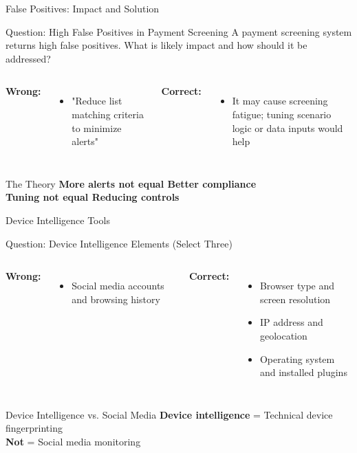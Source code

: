 \documentclass{beamer}
\begin{document}
\begin{frame}{False Positives: Impact and Solution}
\begin{block}{Question: High False Positives in Payment Screening}
\small{A payment screening system returns high false positives. What is likely impact and how should it be addressed?}
\end{block}

\begin{columns}
\textcolor{wrong}{\textbf{ Wrong:}}
\begin{itemize}
    \item "Reduce list matching criteria to minimize alerts"
\end{itemize}

\textcolor{correct}{\textbf{Correct:}}
\begin{itemize}
    \item It may cause screening fatigue; tuning scenario logic or data inputs would help
\end{itemize}
\end{columns}

\begin{block}{The Theory}
\textbf{More alerts not equal Better compliance} \\
\textbf{Tuning not equal Reducing controls}
\end{block}
\end{frame}

\begin{frame}{Device Intelligence Tools}
\begin{block}{Question: Device Intelligence Elements (Select Three)}
\end{block}

\begin{columns}
\textcolor{wrong}{\textbf{ Wrong:}}
\begin{itemize}
    \item Social media accounts and browsing history
\end{itemize}

\textcolor{correct}{\textbf{Correct:}}
\begin{itemize}
    \item Browser type and screen resolution
    \item IP address and geolocation
    \item Operating system and installed plugins
\end{itemize}
\end{columns}

\begin{block}{Device Intelligence vs. Social Media}
\textbf{Device intelligence} = Technical device fingerprinting \\
\textbf{Not} = Social media monitoring
\end{block}
\end{frame}
\end{document}
